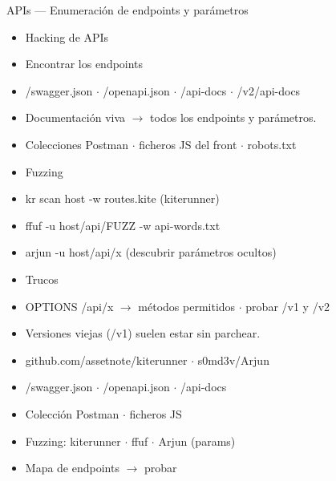 \documentclass[aspectratio=169,10pt]{beamer}
\begin{document}
\begin{frame}[allowframebreaks]{APIs --- Enumeración de endpoints y parámetros}
\small
  \begin{itemize}
  \item Hacking de APIs
  \item Encontrar los endpoints
  \item /swagger.json $\cdot$ /openapi.json $\cdot$ /api-docs $\cdot$ /v2/api-docs
  \item Documentación viva $\rightarrow$ todos los endpoints y parámetros.
  \item Colecciones Postman $\cdot$ ficheros JS del front $\cdot$ robots.txt
  \item Fuzzing
  \item kr scan host -w routes.kite (kiterunner)
  \item ffuf -u host/api/FUZZ -w api-words.txt
  \item arjun -u host/api/x (descubrir parámetros ocultos)
  \item Trucos
  \item OPTIONS /api/x $\rightarrow$ métodos permitidos $\cdot$ probar /v1 y /v2
  \item Versiones viejas (/v1) suelen estar sin parchear.
  \item github.com/assetnote/kiterunner $\cdot$ s0md3v/Arjun
  \item /swagger.json $\cdot$ /openapi.json $\cdot$ /api-docs
  \item Colección Postman $\cdot$ ficheros JS
  \item Fuzzing: kiterunner $\cdot$ ffuf $\cdot$ Arjun (params)
  \item Mapa de endpoints $\rightarrow$ probar
  \end{itemize}
\end{frame}
\end{document}
